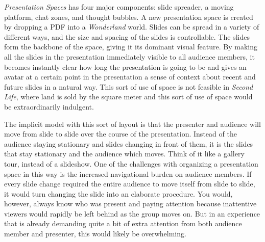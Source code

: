 \emph{Presentation Spaces} has four major components: slide spreader, a moving platform, chat zones, and thought bubbles. A new presentation space is created by dropping a PDF into a \emph{Wonderland} world. Slides can be spread in a variety of different ways, and the size and spacing of the slides is controllable. The slides form the backbone of the space, giving it its dominant visual feature. By making all the slides in the presentation immediately visible to all audience members, it becomes instantly clear how long the presentation is going to be and gives an avatar at a certain point in the presentation a sense of context about recent and future slides in a natural way. This sort of use of space is not feasible in \emph{Second Life}, where land is sold by the square meter and this sort of use of space would be extraordinarily indulgent. 

The implicit model with this sort of layout is that the presenter and audience will move from slide to slide over the course of the presentation. Instead of the audience staying stationary and slides changing in front of them, it is the slides that stay stationary and the audience which moves. Think of it like a gallery tour, instead of a slideshow. One of the challenges with organizing a presentation space in this way is the increased navigational burden on audience members. If every slide change required the entire audience to move itself from slide to slide, it would turn changing the slide into an elaborate procedure. You would, however, always know who was present and paying attention because inattentive viewers would rapidly be left behind as the group moves on. But in an experience that is already demanding quite a bit of extra attention from both audience member and presenter, this would likely be overwhelming. 

